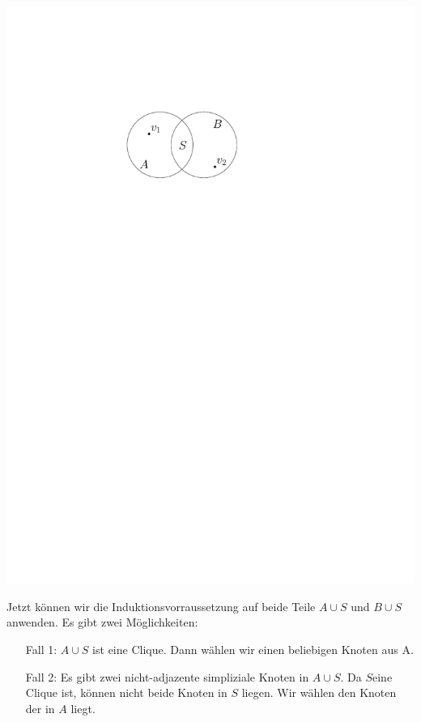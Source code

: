 \begin{center}
    \vspace{1ex}
    \includegraphics[page=1]{fig/03-2b-sep}
\end{center}

Jetzt können wir die Induktionsvorraussetzung auf beide Teile $A \cup S$ und $B \cup S$ anwenden.
Es gibt zwei Möglichkeiten:

\begin{itemize}
	\item [Fall 1:] $A \cup S$ ist eine Clique. Dann wählen wir einen beliebigen Knoten aus A.
	\item [Fall 2:] Es gibt zwei nicht-adjazente simpliziale Knoten in $A \cup S$. Da $S$eine Clique ist, können nicht beide Knoten in $S$ liegen. Wir wählen den Knoten der in $A$ liegt.
\end{itemize}

